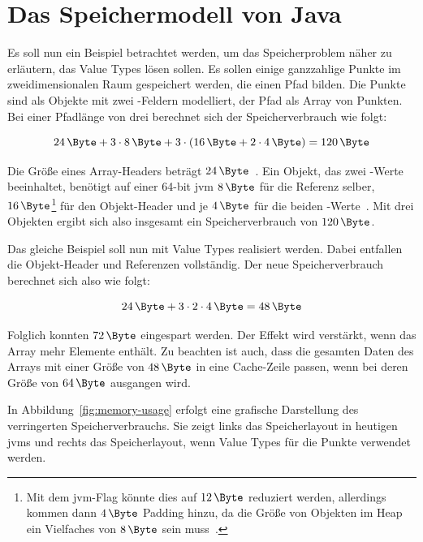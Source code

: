 \section{Das Speichermodell von Java}\label{sec:memory-model}

Es soll nun ein Beispiel betrachtet werden, um das Speicherproblem näher zu erläutern, das Value Types lösen sollen.
Es sollen einige ganzzahlige Punkte im zweidimensionalen Raum gespeichert werden, die einen Pfad bilden.
Die Punkte sind als Objekte mit zwei -Feldern modelliert, der Pfad als Array von Punkten.
Bei einer Pfadlänge von drei berechnet sich der Speicherverbrauch wie folgt:

\begin{equation}
    \SI{24}{\Byte} + 3 \cdot \SI{8}{\Byte} + 3 \cdot (\SI{16}{\Byte} + 2 \cdot \SI{4}{\Byte}) = \SI{120}{\Byte}\label{eq:memory-usage-current}
\end{equation}

Die Größe eines Array-Headers beträgt $\SI{24}{\Byte}$~\cite{compressed-oops}.
Ein Objekt, das zwei -Werte beeinhaltet, benötigt auf einer 64-bit \ac{jvm} $\SI{8}{\Byte}$ für die Referenz selber, $\SI{16}{\Byte}$\footnote{Mit dem \ac{jvm}-Flag  könnte dies auf $\SI{12}{\Byte}$ reduziert werden, allerdings kommen dann $\SI{4}{\Byte}$ Padding hinzu, da die Größe von Objekten im Heap ein Vielfaches von $\SI{8}{\Byte}$ sein muss~\cite{compressed-oops}.} für den Objekt-Header und je $\SI{4}{\Byte}$ für die beiden -Werte~\cite{compressed-oops}.
Mit drei Objekten ergibt sich also insgesamt ein Speicherverbrauch von $\SI{120}{\Byte}$.

Das gleiche Beispiel soll nun mit Value Types realisiert werden.
Dabei entfallen die Objekt-Header und Referenzen vollständig.
Der neue Speicherverbrauch berechnet sich also wie folgt:

\begin{equation}
    \SI{24}{\Byte} + 3 \cdot 2 \cdot \SI{4}{\Byte} = \SI{48}{\Byte}\label{eq:memory-usage-inline}
\end{equation}

Folglich konnten $\SI{72}{\Byte}$ eingespart werden.
Der Effekt wird verstärkt, wenn das Array mehr Elemente enthält.
Zu beachten ist auch, dass die gesamten Daten des Arrays mit einer Größe von $\SI{48}{\Byte}$ in eine Cache-Zeile passen, wenn bei deren Größe von $\SI{64}{\Byte}$ ausgangen wird.

In Abbildung~\ref{fig:memory-usage} erfolgt eine grafische Darstellung des verringerten Speicherverbrauchs.
Sie zeigt links das Speicherlayout in heutigen \acp{jvm} und rechts das Speicherlayout, wenn Value Types für die Punkte verwendet werden.

